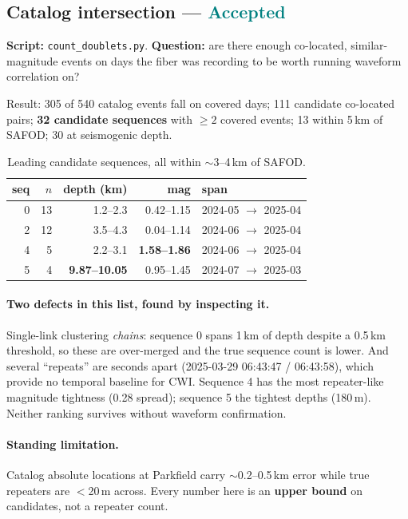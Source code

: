 \documentclass[11pt]{article}
\newcommand{\accepted}{\textcolor{teal}{\textbf{Accepted}}}
\begin{document}
\subsection{Catalog intersection --- \accepted}

\textbf{Script:} \texttt{count\_doublets.py}. \textbf{Question:} are there enough
co-located, similar-magnitude events on days the fiber was recording to be worth
running waveform correlation on?

Result: 305 of 540 catalog events fall on covered days; 111 candidate co-located
pairs; \textbf{32 candidate sequences} with $\ge 2$ covered events; 13 within
5\,km of SAFOD; 30 at seismogenic depth.

\begin{table}[H]
\centering
\begin{tabular}{rrrrl}
\toprule
seq & $n$ & depth (km) & mag & span \\
\midrule
0 & 13 & 1.2--2.3 & 0.42--1.15 & 2024-05 $\to$ 2025-04 \\
2 & 12 & 3.5--4.3 & 0.04--1.14 & 2024-06 $\to$ 2025-04 \\
4 &  5 & 2.2--3.1 & \textbf{1.58--1.86} & 2024-06 $\to$ 2025-04 \\
5 &  4 & \textbf{9.87--10.05} & 0.95--1.45 & 2024-07 $\to$ 2025-03 \\
\bottomrule
\end{tabular}
\caption{Leading candidate sequences, all within $\sim$3--4\,km of SAFOD.}
\end{table}

\paragraph{Two defects in this list, found by inspecting it.} Single-link
clustering \emph{chains}: sequence 0 spans 1\,km of depth despite a 0.5\,km
threshold, so these are over-merged and the true sequence count is lower. And
several ``repeats'' are seconds apart (2025-03-29 06:43:47 / 06:43:58), which
provide no temporal baseline for CWI. Sequence 4 has the most repeater-like
magnitude tightness (0.28 spread); sequence 5 the tightest depths (180\,m).
Neither ranking survives without waveform confirmation.

\paragraph{Standing limitation.} Catalog absolute locations at Parkfield carry
$\sim$0.2--0.5\,km error while true repeaters are $<$20\,m across. Every number
here is an \textbf{upper bound} on candidates, not a repeater count.
\end{document}

